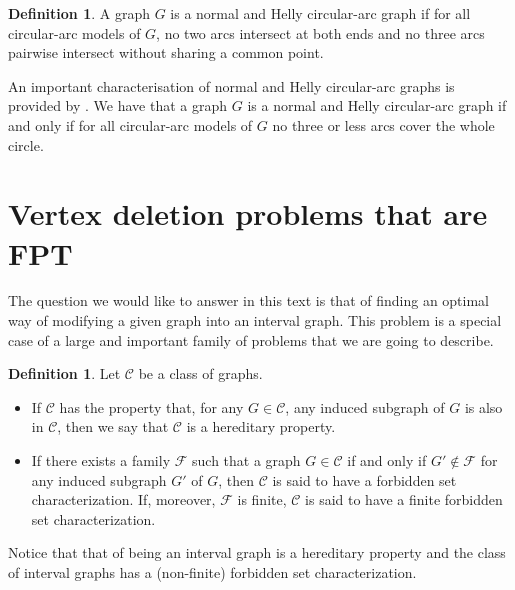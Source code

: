 \documentclass{article}
\theoremstyle{definition}
\newtheorem{defn}[thm]{Definition}
\begin{document}
    \begin{defn}
        A graph $G$ is
        a normal and Helly circular-arc
        graph if for all
        circular-arc models
        of $G$,
        no two arcs intersect 
        at both ends and
        no three arcs 
        pairwise intersect without
        sharing a common point.
    \end{defn}

    An important characterisation
    of normal and Helly circular-arc
    graphs is provided by \cite{nor-Helly-char}.
    We have that a graph $G$ is a normal
    and Helly circular-arc graph
    if and only if for all
    circular-arc models of $G$ 
    no three or less arcs cover the
    whole circle.

    \section{Vertex deletion problems that are FPT}
    
    The question we would like to 
    answer in this text is that of
    finding an optimal way of modifying
    a given graph into an interval graph.
    This problem is a special case 
    of a large and important family of problems
    that we are going to describe.

    \begin{defn}
        Let $\mathcal{C}$ be a class of graphs.
        \begin{itemize}
            \item If $\mathcal{C}$ has the property that, for any $G \in \mathcal{C}$,
                any induced subgraph of $G$ is also in $\mathcal{C}$,
                then we say that $\mathcal{C}$ is a hereditary property.
            \item If there exists a family $\mathcal{F}$ such that
                a graph $G \in \mathcal{C}$ if and only if $G' \not \in \mathcal{F}$
                for any induced subgraph $G'$ of $G$, then $\mathcal{C}$ 
                is said to have a forbidden set characterization.
                If, moreover, $\mathcal{F}$ is finite, $\mathcal{C}$ is 
                said to have a finite forbidden set characterization.
        \end{itemize}
    \end{defn}

    Notice that that of being an interval graph
    is a hereditary property
    and the class of interval
    graphs has a (non-finite) forbidden
    set characterization.
        
\end{document}
